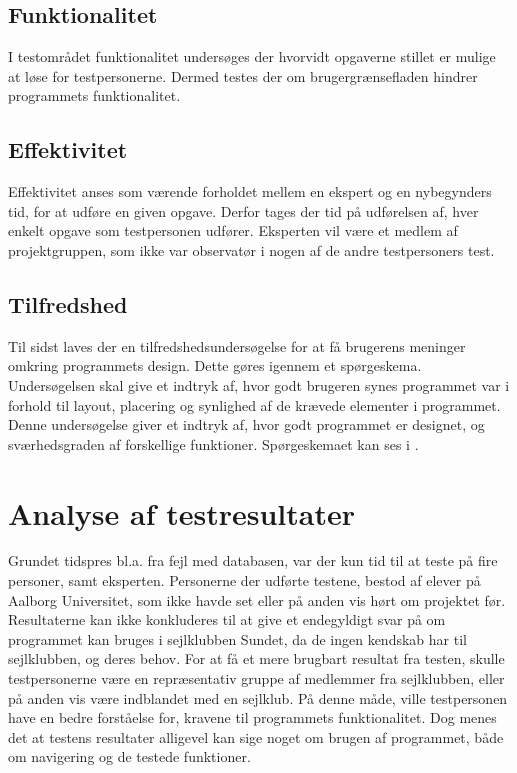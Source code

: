 \subsection{Funktionalitet}
I testområdet funktionalitet undersøges der hvorvidt opgaverne stillet er mulige at løse for testpersonerne.
Dermed testes der om brugergrænsefladen hindrer programmets funktionalitet. 

\subsection{Effektivitet}
Effektivitet anses som værende forholdet mellem en ekspert og en nybegynders tid, for at udføre en given opgave.\citep{UIEffeciency}
Derfor tages der tid på udførelsen af, hver enkelt opgave som testpersonen udfører.
Eksperten vil være et medlem af projektgruppen, som ikke var observatør i nogen af de andre testpersoners test. 

\subsection{Tilfredshed}
Til sidst laves der en tilfredshedsundersøgelse for at få brugerens meninger omkring programmets design. 
Dette gøres igennem et spørgeskema. 
Undersøgelsen skal give et indtryk af, hvor godt brugeren synes programmet var i forhold til layout, placering og synlighed af de krævede elementer i programmet. 
Denne undersøgelse giver et indtryk af, hvor godt programmet er designet, og sværhedsgraden af forskellige funktioner. 
Spørgeskemaet kan ses i . \citep{UISatisfaction}


\section{Analyse af testresultater}

Grundet tidspres bl.a. fra fejl med databasen, var der kun tid til at teste på fire personer, samt eksperten.
Personerne der udførte testene, bestod af elever på Aalborg Universitet, som ikke havde set eller på anden vis hørt om projektet før.
Resultaterne kan ikke konkluderes til at give et endegyldigt svar på om programmet kan bruges i sejlklubben Sundet, da de ingen kendskab har til sejlklubben, og deres behov.
For at få et mere brugbart resultat fra testen, skulle testpersonerne være en repræsentativ gruppe af medlemmer fra sejlklubben, eller på anden vis være indblandet med en sejlklub. 
På denne måde, ville testpersonen have en bedre forståelse for, kravene til programmets funktionalitet.
Dog menes det at testens resultater alligevel kan sige noget om brugen af programmet, både om navigering og de testede funktioner.
